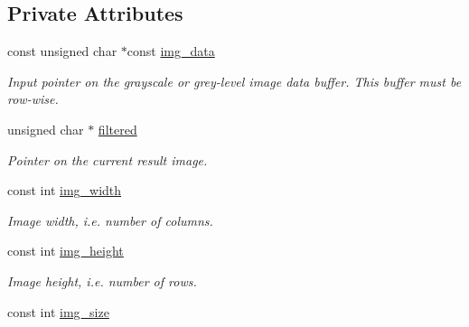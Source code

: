 \subsection*{Private Attributes}
\begin{DoxyCompactItemize}
\item 
\hypertarget{classofeli_1_1_filters_a375494bcc04ceef4f48e859f2c8afe09}{const unsigned char $\ast$const \hyperlink{classofeli_1_1_filters_a375494bcc04ceef4f48e859f2c8afe09}{img\-\_\-data}}\label{classofeli_1_1_filters_a375494bcc04ceef4f48e859f2c8afe09}

\begin{DoxyCompactList}\small\item\em Input pointer on the grayscale or grey-\/level image data buffer. This buffer must be row-\/wise. \end{DoxyCompactList}\item 
\hypertarget{classofeli_1_1_filters_aa4afdd919dfccb08023dee3634b03a30}{unsigned char $\ast$ \hyperlink{classofeli_1_1_filters_aa4afdd919dfccb08023dee3634b03a30}{filtered}}\label{classofeli_1_1_filters_aa4afdd919dfccb08023dee3634b03a30}

\begin{DoxyCompactList}\small\item\em Pointer on the current result image. \end{DoxyCompactList}\item 
\hypertarget{classofeli_1_1_filters_adfafb4edd683c3cc02997328296df055}{const int \hyperlink{classofeli_1_1_filters_adfafb4edd683c3cc02997328296df055}{img\-\_\-width}}\label{classofeli_1_1_filters_adfafb4edd683c3cc02997328296df055}

\begin{DoxyCompactList}\small\item\em Image width, i.\-e. number of columns. \end{DoxyCompactList}\item 
\hypertarget{classofeli_1_1_filters_a433940423042a8efbdbf1576db1cfa70}{const int \hyperlink{classofeli_1_1_filters_a433940423042a8efbdbf1576db1cfa70}{img\-\_\-height}}\label{classofeli_1_1_filters_a433940423042a8efbdbf1576db1cfa70}

\begin{DoxyCompactList}\small\item\em Image height, i.\-e. number of rows. \end{DoxyCompactList}\item 
\hypertarget{classofeli_1_1_filters_a1c8ad08ed27f16f0def6416ff009599c}{const int \hyperlink{classofeli_1_1_filters_a1c8ad08ed27f16f0def6416ff009599c}{img\-\_\-size}}\label{classofeli_1_1_filters_a1c8ad08ed27f16f0def6416ff009599c}


\end{DoxyCompactItemize}
